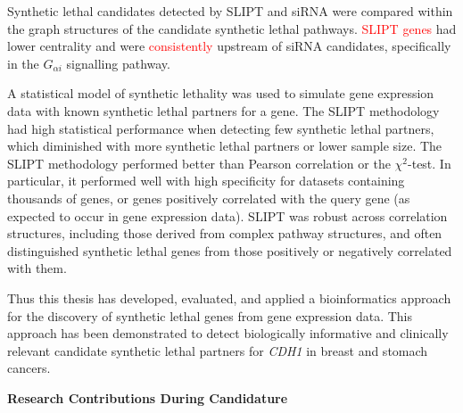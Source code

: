 Synthetic lethal candidates detected by \acrshort{SLIPT} and \acrshort{siRNA} were compared within the graph structures of the candidate synthetic lethal pathways.
\textcolor{red}{SLIPT genes} had lower centrality and were \textcolor{red}{consistently} upstream of \acrshort{siRNA} candidates, specifically in the $G_{\alpha i}$ signalling pathway.

A statistical model of synthetic lethality was used to simulate gene expression data with known synthetic lethal partners for a gene. The \acrshort{SLIPT} methodology had high statistical performance when detecting few synthetic lethal partners, which diminished with more synthetic lethal partners or lower sample size. The \acrshort{SLIPT} methodology performed better than Pearson correlation or the $\chi^2$-test. In particular, it performed well with high specificity for datasets containing thousands of genes, or genes positively correlated with the query gene (as expected to occur in gene expression data). \acrshort{SLIPT} was robust across correlation structures, including those derived from complex pathway structures, and often distinguished synthetic lethal genes from those positively or negatively correlated with them. %


Thus this thesis has developed, evaluated, and applied a bioinformatics approach for the discovery of synthetic lethal genes from gene expression data. This approach has been demonstrated to detect biologically informative and clinically relevant candidate synthetic lethal partners for \textit{CDH1} in breast and stomach cancers. %

\iffalse
\clearpage

\begin{center}
 \textbf{Research Contributions During Candidature}
\end{center}

